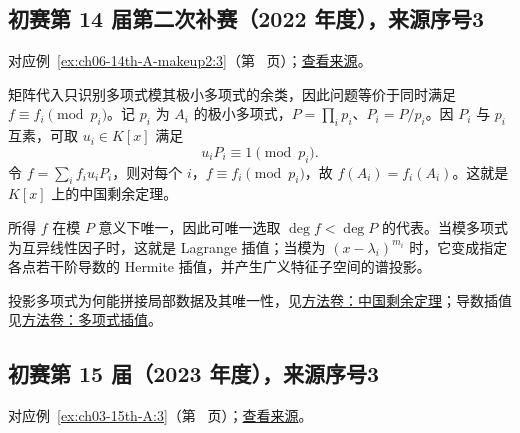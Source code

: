 \documentclass[12pt,fontset=fandol]{ctexart}
\begin{document}
\subsection{初赛第 14 届第二次补赛（2022 年度），来源序号3}\label{ans:ch06-14th-A-makeup2:3}\label{pr:ch06-14th-A-makeup2:3}

对应例~\ref{ex:ch06-14th-A-makeup2:3}（第~\pageref{ex:ch06-14th-A-makeup2:3} 页）；\href{https://github.com/lzxcr/cmc-mathematics/blob/64916fa1fdbc3e444a652eca204d5669058ee321/src/problems/preliminary/14-makeup2/03.md}{查看来源}。

\begin{solve}

矩阵代入只识别多项式模其极小多项式的余类，因此问题等价于同时满足 $f\equiv f_i\pmod{p_i}$。记 $p_i$ 为 $A_i$ 的极小多项式，$P=\prod_i p_i$、$P_i=P/p_i$。因 $P_i$ 与 $p_i$ 互素，可取 $u_i\in K[x]$ 满足
\[
u_iP_i\equiv1\pmod{p_i}.
\]
令 $f=\sum_i f_i u_iP_i$，则对每个 $i$，$f\equiv f_i\pmod{p_i}$，故 $f(A_i)=f_i(A_i)$。这就是 $K[x]$ 上的中国剩余定理。

\end{solve}

\begin{remark}[方法与条件]

所得 $f$ 在模 $P$ 意义下唯一，因此可唯一选取 $\deg f<\deg P$ 的代表。当模多项式为互异线性因子时，这就是 Lagrange 插值；当模为 $(x-\lambda_i)^{m_i}$ 时，它变成指定各点若干阶导数的 Hermite 插值，并产生广义特征子空间的谱投影。

投影多项式为何能拼接局部数据及其唯一性，见\hyperref[app:algebra-crt]{方法卷：中国剩余定理}；导数插值见\hyperref[app:algebra-interpolation]{方法卷：多项式插值}。

\end{remark}

\subsection{初赛第 15 届（2023 年度），来源序号3}\label{ans:ch03-15th-A:3}\label{pr:ch03-15th-A:3}

对应例~\ref{ex:ch03-15th-A:3}（第~\pageref{ex:ch03-15th-A:3} 页）；\href{https://github.com/lzxcr/cmc-mathematics/blob/64916fa1fdbc3e444a652eca204d5669058ee321/src/problems/preliminary/15/03.md}{查看来源}。
\end{document}
